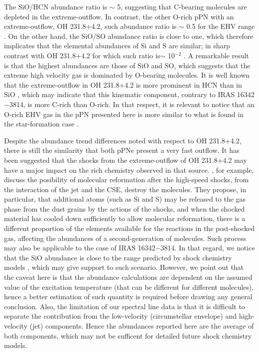 \documentclass[a4paper,fleqn,usenatbib]{mnras}
\begin{document}
The SiO/HCN abundance ratio is $\sim$ 5, suggesting that C-bearing molecules are depleted in the extreme-outflow. In contrast, the other O-rich pPN with an extreme-outflow, OH 231.8$+$4.2, such abundance ratio is $\sim$ 0.5 for the EHV range \citep[average of $\sim$ 0.3 for the whole line emission range:][]{Sanchez97}. On the other hand, the SiO/SO abundance ratio is close to one, which therefore implicates that the elemental abundances of Si and S are similar; in sharp contrast with OH 231.8$+$4.2 for which such ratio is$\sim$ 10$^{-2}$ \citep{Sanchez97,Claude2000}. A remarkable result is that the highest abundances are those of SiO and SO, which suggests that the extreme high velocity gas is dominated by O-bearing molecules. It is well known that the extreme-outflow in OH 231.8$+$4.2 is more prominent in HCN than in SiO \citep[e.g.,][]{Sanchez97}, which may indicate that this kinematic component, contrary to IRAS 16342$-$3814, is more C-rich than O-rich. In that respect, it is relevant to notice that an O-rich EHV gas in the pPN presented here is more similar to what is found in the star-formation case \citep{Tafalla10}.  

Despite the abundance trend differences noted with respect to OH 231.8$+$4.2, there is still the similarity that both pPNe present a very fast outflow. It has been suggested that the shocks from the extreme-outflow of OH 231.8$+$4.2 may have a major impact on the rich chemistry observed in that source. \citet{Velilla15}, for example, discuss the posibility of molecular reformation after the high-speed shocks, from the interaction of the jet and the CSE, destroy the molecules. They propose, in particular, that additional atoms (such as Si and S) may be released to the gas phase from the dust grains by the actions of the shocks, and when the shocked material has cooled down sufficiently to allow molecular reformation, there is a different proportion of the elements available for the reactions in the post-shocked gas, affecting the abundances of a second-generation of molecules. Such process may also be applicable to the case of IRAS 16342$-$3814. In that regard, we notice that the SiO abundance is close to the range predicted by shock chemistry models \citep[SiO production in the gas phase through the sputtering of Si-bearing material in refractory grain cores:][]{Gusdorf08a}, which may give support to such scenario. However, we point out that the caveat here is that the abundance calculations are dependent on the assumed value of the excitation temperature (that can be different for different molecules), hence a better estimation of such quantity is required before drawing any general conclusion. Also, the limitation of our spectral line data is that it is difficult to separate the contribution from the low-velocity (circumstellar envelope) and high-velocity (jet) components. Hence the abundances reported here are the average of both components, which may not be sufficent for detailed future shock chemistry models. 
\end{document}
